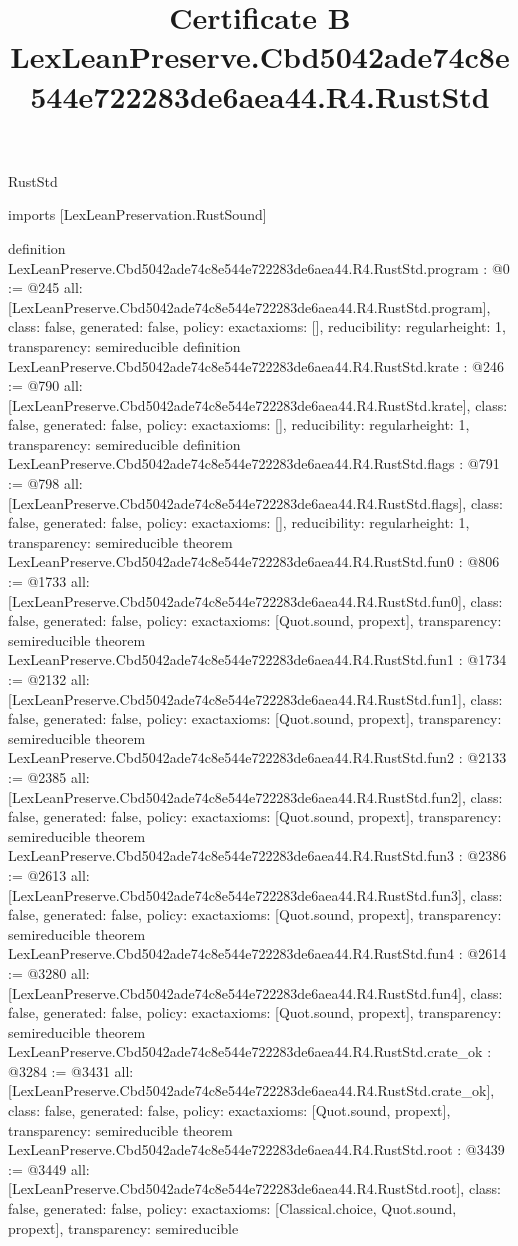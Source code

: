 \begin{lexlean}{RustStd}
\title{Certificate B LexLeanPreserve.Cbd5042ade74c8e544e722283de6aea44.R4.RustStd}
\begin{coremodule}
imports [LexLeanPreservation.RustSound]

definition LexLeanPreserve.Cbd5042ade74c8e544e722283de6aea44.R4.RustStd.program : @0 := @245 {
  all: [LexLeanPreserve.Cbd5042ade74c8e544e722283de6aea44.R4.RustStd.program],
  class: false,
  generated: false,
  policy: exact{axioms: []},
  reducibility: regular{height: 1},
  transparency: semireducible
}
definition LexLeanPreserve.Cbd5042ade74c8e544e722283de6aea44.R4.RustStd.krate : @246 := @790 {
  all: [LexLeanPreserve.Cbd5042ade74c8e544e722283de6aea44.R4.RustStd.krate],
  class: false,
  generated: false,
  policy: exact{axioms: []},
  reducibility: regular{height: 1},
  transparency: semireducible
}
definition LexLeanPreserve.Cbd5042ade74c8e544e722283de6aea44.R4.RustStd.flags : @791 := @798 {
  all: [LexLeanPreserve.Cbd5042ade74c8e544e722283de6aea44.R4.RustStd.flags],
  class: false,
  generated: false,
  policy: exact{axioms: []},
  reducibility: regular{height: 1},
  transparency: semireducible
}
theorem LexLeanPreserve.Cbd5042ade74c8e544e722283de6aea44.R4.RustStd.fun0 : @806 := @1733 {
  all: [LexLeanPreserve.Cbd5042ade74c8e544e722283de6aea44.R4.RustStd.fun0],
  class: false,
  generated: false,
  policy: exact{axioms: [Quot.sound, propext]},
  transparency: semireducible
}
theorem LexLeanPreserve.Cbd5042ade74c8e544e722283de6aea44.R4.RustStd.fun1 : @1734 := @2132 {
  all: [LexLeanPreserve.Cbd5042ade74c8e544e722283de6aea44.R4.RustStd.fun1],
  class: false,
  generated: false,
  policy: exact{axioms: [Quot.sound, propext]},
  transparency: semireducible
}
theorem LexLeanPreserve.Cbd5042ade74c8e544e722283de6aea44.R4.RustStd.fun2 : @2133 := @2385 {
  all: [LexLeanPreserve.Cbd5042ade74c8e544e722283de6aea44.R4.RustStd.fun2],
  class: false,
  generated: false,
  policy: exact{axioms: [Quot.sound, propext]},
  transparency: semireducible
}
theorem LexLeanPreserve.Cbd5042ade74c8e544e722283de6aea44.R4.RustStd.fun3 : @2386 := @2613 {
  all: [LexLeanPreserve.Cbd5042ade74c8e544e722283de6aea44.R4.RustStd.fun3],
  class: false,
  generated: false,
  policy: exact{axioms: [Quot.sound, propext]},
  transparency: semireducible
}
theorem LexLeanPreserve.Cbd5042ade74c8e544e722283de6aea44.R4.RustStd.fun4 : @2614 := @3280 {
  all: [LexLeanPreserve.Cbd5042ade74c8e544e722283de6aea44.R4.RustStd.fun4],
  class: false,
  generated: false,
  policy: exact{axioms: [Quot.sound, propext]},
  transparency: semireducible
}
theorem LexLeanPreserve.Cbd5042ade74c8e544e722283de6aea44.R4.RustStd.crate_ok : @3284 := @3431 {
  all: [LexLeanPreserve.Cbd5042ade74c8e544e722283de6aea44.R4.RustStd.crate_ok],
  class: false,
  generated: false,
  policy: exact{axioms: [Quot.sound, propext]},
  transparency: semireducible
}
theorem LexLeanPreserve.Cbd5042ade74c8e544e722283de6aea44.R4.RustStd.root : @3439 := @3449 {
  all: [LexLeanPreserve.Cbd5042ade74c8e544e722283de6aea44.R4.RustStd.root],
  class: false,
  generated: false,
  policy: exact{axioms: [Classical.choice, Quot.sound, propext]},
  transparency: semireducible
}


\end{coremodule}
\end{lexlean}

